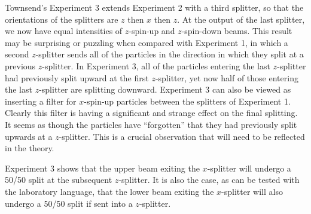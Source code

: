 \documentclass{eptcs}
\begin{document}
Townsend's Experiment 3 extends Experiment 2 with a third
splitter, so that the orientations of the splitters are $z$
then $x$ then $z$.  At the output of the last splitter,
we now have equal intensities of $z$-spin-up and $z$-spin-down
beams.
This result may be surprising or puzzling
when compared with Experiment 1, in which a second $z$-splitter
sends all of the particles in the direction in which they
split at a previous $z$-splitter.
In Experiment 3, all of the particles entering the last $z$-splitter
had previously split upward at the first $z$-splitter, yet now half
of those entering the last $z$-splitter are splitting downward.
Experiment 3 can also be viewed as inserting a filter for $x$-spin-up
particles between the splitters of Experiment 1.
Clearly this filter is having a significant and strange effect
on the final splitting.  It seems as though the particles have
``forgotten'' that they had previously split upwards at a $z$-splitter.
This is a crucial observation that will need to be reflected in the
theory.

Experiment 3 shows that the upper beam exiting the $x$-splitter
will undergo a 50/50 split at the subsequent $z$-splitter.
It is also the case, as can be tested with the laboratory language,
that the lower beam exiting the $x$-splitter
will also undergo a 50/50 split if sent into a $z$-splitter.
\end{document}

